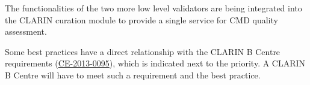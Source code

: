 The functionalities of the two more low level validators are being integrated into the CLARIN curation module to provide a single service for CMD quality assessment.

Some best practices have a direct relationship with the CLARIN B Centre requirements (\href{http://hdl.handle.net/11372/DOC-78}{CE-2013-0095}),
which is indicated next to the priority. A CLARIN B Centre will have to meet such a requirement and the best practice.
